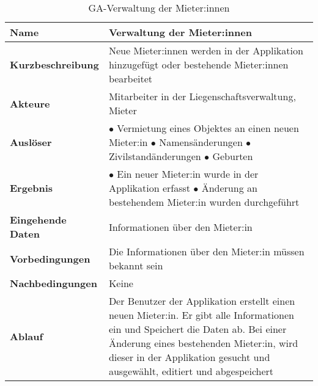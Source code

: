 \begin{table}[H]
  \centering
  \settowidth{}
  \setlength\extrarowheight{2pt}
  \begin{tabulary}{1.0\textwidth}{|a|m{12cm}|}
    \hline
    \textbf{Name}& Verwaltung der Mieter:innen\\
    \hline 
    \textbf{Kurzbeschreibung} & Neue Mieter:innen werden in der Applikation hinzugefügt oder bestehende Mieter:innen bearbeitet\\
    \hline
    \textbf{Akteure} & Mitarbeiter in der Liegenschaftsverwaltung, Mieter\\
    \hline
    \textbf{Auslöser} & 
      $\bullet$ Vermietung eines Objektes an einen neuen Mieter:in \newline
      $\bullet$ Namensänderungen \newline
      $\bullet$ Zivilstandänderungen \newline
      $\bullet$ Geburten\\
    \hline
    \textbf{Ergebnis} &
      $\bullet$ Ein neuer Mieter:in wurde in der Applikation erfasst \newline
      $\bullet$ Änderung an bestehendem Mieter:in wurden durchgeführt\\
    \hline
    \textbf{Eingehende Daten} & Informationen über den Mieter:in\\
    \hline
    \textbf{Vorbedingungen} & Die Informationen über den Mieter:in müssen bekannt sein\\
    \hline
    \textbf{Nachbedingungen} & Keine\\
    \hline
    \textbf{Ablauf} & Der Benutzer der Applikation erstellt einen neuen Mieter:in. Er gibt alle Informationen ein und Speichert die Daten ab. Bei einer Änderung eines bestehenden Mieter:in, wird dieser in der Applikation gesucht und ausgewählt, editiert und abgespeichert\\
    \hline
  \end{tabulary}
  \caption{GA-Verwaltung der Mieter:innen}
\end{table}

